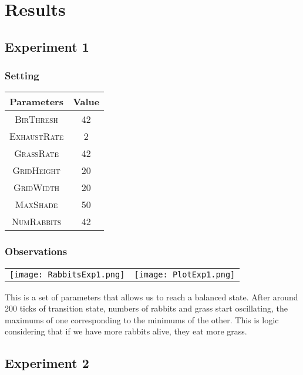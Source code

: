 \documentclass[11pt]{article}
\begin{document}
\section{Results}

\subsection{Experiment 1}

\subsubsection{Setting}
\begin{tabular}{ |c|c| }
 \hline
 Parameters & Value \\
 \hline\hline
 \textsc{BirThresh} & 42 \\
 \textsc{ExhaustRate} & 2 \\
 \textsc{GrassRate} & 42 \\
 \textsc{GridHeight} & 20 \\
 \textsc{GridWidth} & 20 \\
 \textsc{MaxShade} & 50 \\
 \textsc{NumRabbits} & 42 \\
 \hline
\end{tabular}
\subsubsection{Observations}
\begin{tabular}{|c c|}
\texttt{[image: RabbitsExp1.png]}&\texttt{[image: PlotExp1.png]}
\end{tabular}

\vspace{5mm}

This is a set of parameters that allows us to reach a balanced state. After around 200 ticks of transition state, numbers of rabbits and grass start oscillating, the maximums of one corresponding to the minimums of the other. This is logic considering that if we have more rabbits alive, they eat more grass.


\subsection{Experiment 2}
\end{document}
